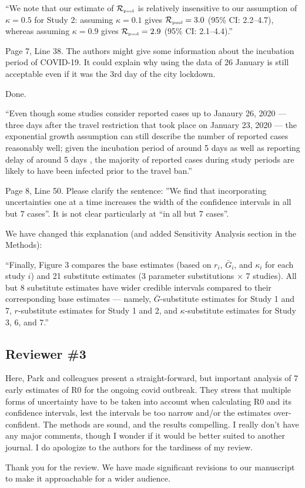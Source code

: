 \documentclass[12pt]{article}
\newcommand{\Rpool}{\ensuremath{{\mathcal R}_{\textrm{\tiny{pool}}}}\xspace}
\newcommand{\rev}{\subsection*}
\newcommand{\revtext}{\textsf}
\begin{document}
``We note that our estimate of \Rpool is relatively insensitive to our assumption of $\kappa=0.5$ for Study 2: assuming $\kappa=0.1$ gives $\Rpool = 3.0$ (95\% CI: 2.2--4.7), whereas assuming $\kappa=0.9$ gives $\Rpool = 2.9$ (95\% CI: 2.1--4.4).''

\revtext{Page 7, Line 38. The authors might give some information about the incubation period of
COVID-19. It could explain why using the data of 26 January is still acceptable even if it was the
3rd day of the city lockdown.}

Done.

``Even though some studies consider reported cases up to Janaury 26, 2020 --- three days after the travel restriction that took place on January 23, 2020 \citep{Tianeabb6105} --- the exponential growth assumption can still describe the number of reported cases reasonably well;
given the incubation period of around 5 days \citep{lauer2020incubation} as well as reporting delay of around 5 days \citep{sun2020early}, the majority of reported cases during study periods are likely to have been infected prior to the travel ban.''

\revtext{Page 8, Line 50. Please clarify the sentence: ”We find that incorporating uncertainties one at a
time increases the width of the confidence intervals in all but 7 cases”. It is not clear particularly
at “in all but 7 cases”.}

We have changed this explanation (and added Sensitivity Analysis section in the Methods): 

``Finally, Figure 3 compares the base estimates (based on $r_i$, $\bar G_i$, and $\kappa_i$ for each study $i$) and 21 substitute estimates (3 parameter substitutions $\times$ 7 studies).
All but 8 substitute estimates have wider credible intervals compared to their corresponding base estimates --- namely, $\bar G$-substitute estimates for Study 1 and 7, $r$-substitute estimates for Study 1 and 2, and  $\kappa$-substitute estimates for Study 3, 6, and 7.''

\rev{Reviewer \#3}

\revtext{
Here, Park and colleagues present a straight-forward, but important analysis of 7 early estimates of R0 for the ongoing covid outbreak. They stress that multiple forms of uncertainty have to be taken into account when calculating R0 and its confidence intervals, lest the intervals be too narrow and/or the estimates over-confident. The methods are sound, and the results compelling. I really don’t have any major comments, though I wonder if it would be better suited to another journal. I do apologize to the authors for the tardiness of my review.}

Thank you for the review. We have made significant revisions to our manuscript to make it approachable for a wider audience.

\pagebreak


\end{document}
